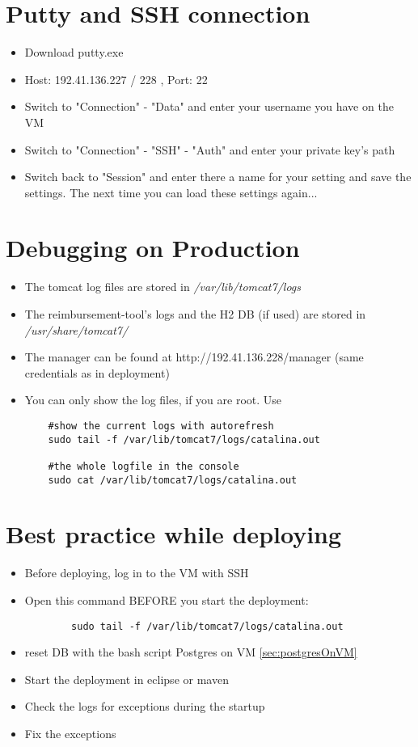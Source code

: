 \section{Putty and SSH connection}
\begin{itemize}
	\item Download putty.exe
	\item Host: 192.41.136.227 / 228 , Port: 22
	\item Switch to "Connection" - "Data" and enter your username you have on the VM
	\item Switch to "Connection" - "SSH" - "Auth" and enter your private key's path
	\item Switch back to "Session" and enter there a name for your setting and save the settings. The next time you can load these settings again...
\end{itemize} 


\section{Debugging on Production}
\begin{itemize}
	\item The tomcat log files are stored in \newline
	\textit{ /var/lib/tomcat7/logs}
	\item The reimbursement-tool's logs and the H2 DB (if used) are stored in \newline \textit{/usr/share/tomcat7/}
	\item The manager can be found at http://192.41.136.228/manager (same credentials as in deployment)
	\item You can only show the log files, if you are root. Use 
	\begin{lstlisting}
	#show the current logs with autorefresh
	sudo tail -f /var/lib/tomcat7/logs/catalina.out
	
	#the whole logfile in the console
	sudo cat /var/lib/tomcat7/logs/catalina.out	\end{lstlisting}
\end{itemize}

\section{Best practice while deploying}
\begin{itemize}
	\item Before deploying, log in to the VM with SSH
	\item Open this command BEFORE you start the deployment:
	\begin{lstlisting}
		sudo tail -f /var/lib/tomcat7/logs/catalina.out
	\end{lstlisting}
	\item reset DB with the bash script Postgres on VM \ref{sec:postgresOnVM}
	\item Start the deployment in eclipse or maven
	\item Check the logs for exceptions during the startup
	\item Fix the exceptions
\end{itemize}

